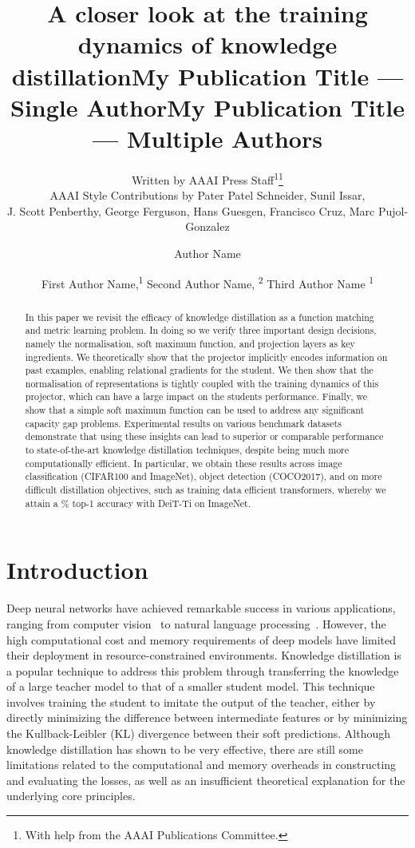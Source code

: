 \documentclass[letterpaper]{article} \usepackage[submission]{aaai23}  \usepackage{times}  \usepackage{helvet}  \usepackage{courier}  \usepackage[hyphens]{url}  \usepackage{graphicx} \urlstyle{rm} \def\UrlFont{\rm}  \usepackage{natbib}  \usepackage{caption} \frenchspacing  \setlength{\pdfpagewidth}{8.5in} \setlength{\pdfpageheight}{11in} \usepackage{algorithm}
\title{A closer look at the training dynamics of knowledge distillation}
\author{
Written by AAAI Press Staff\textsuperscript{\rm 1}\thanks{With help from the AAAI Publications Committee.}\\
    AAAI Style Contributions by Pater Patel Schneider,
    Sunil Issar,\\
    J. Scott Penberthy,
    George Ferguson,
    Hans Guesgen,
    Francisco Cruz\equalcontrib,
    Marc Pujol-Gonzalez\equalcontrib
}
\title{My Publication Title --- Single Author}
\author {
    Author Name
}
\title{My Publication Title --- Multiple Authors}
\author {
First Author Name,\textsuperscript{\rm 1}
    Second Author Name, \textsuperscript{\rm 2}
    Third Author Name \textsuperscript{\rm 1}
}
\begin{document}
\maketitle

\begin{abstract}
In this paper we revisit the efficacy of knowledge distillation as a function matching and metric learning problem. In doing so we verify three important design decisions, namely the normalisation, soft maximum function, and projection layers as key ingredients. We theoretically show that the projector implicitly encodes information on past examples, enabling relational gradients for the student. We then show that the normalisation of representations is tightly coupled with the training dynamics of this projector, which can have a large impact on the students performance. Finally, we show that a simple soft maximum function can be used to address any significant capacity gap problems. Experimental results on various benchmark datasets demonstrate that using these insights can lead to superior or comparable performance to state-of-the-art knowledge distillation techniques, despite being much more computationally efficient. In particular, we obtain these results across image classification (CIFAR100 and ImageNet), object detection (COCO2017), and on more difficult distillation objectives, such as training data efficient transformers, whereby we attain a \% top-1 accuracy with DeiT-Ti on ImageNet.
\end{abstract}

\section{Introduction}
\label{sec:intro}
Deep neural networks have achieved remarkable success in various applications, ranging from computer vision~\cite{Krizhevsky2012ImageNetNetworks} to natural language processing~\cite{Vaswani2017AttentionNeed}. However, the high computational cost and memory requirements of deep models have limited their deployment in resource-constrained environments. Knowledge distillation is a popular technique to address this problem through transferring the knowledge of a large teacher model to that of a smaller student model. This technique involves training the student to imitate the output of the teacher, either by directly minimizing the difference between intermediate features or by minimizing the Kullback-Leibler (KL) divergence between their soft predictions. Although knowledge distillation has shown to be very effective, there are still some limitations related to the computational and memory overheads in constructing and evaluating the losses, as well as an insufficient theoretical explanation for the underlying core principles.
\end{document}
